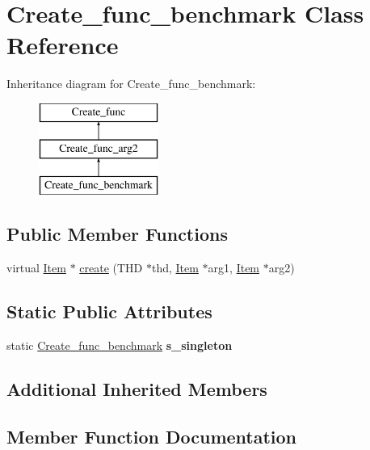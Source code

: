 \hypertarget{classCreate__func__benchmark}{}\section{Create\+\_\+func\+\_\+benchmark Class Reference}
\label{classCreate__func__benchmark}
Inheritance diagram for Create\+\_\+func\+\_\+benchmark\+:\begin{figure}[H]
\begin{center}
\leavevmode
\includegraphics[height=3.000000cm]{classCreate__func__benchmark}
\end{center}
\end{figure}
\subsection*{Public Member Functions}
\begin{DoxyCompactItemize}
\item 
virtual \mbox{\hyperlink{classItem}{Item}} $\ast$ \mbox{\hyperlink{classCreate__func__benchmark_acb85d1eecc34e6050847c6d6f1016d4b}{create}} (T\+HD $\ast$thd, \mbox{\hyperlink{classItem}{Item}} $\ast$arg1, \mbox{\hyperlink{classItem}{Item}} $\ast$arg2)
\end{DoxyCompactItemize}
\subsection*{Static Public Attributes}
\begin{DoxyCompactItemize}
\item 
\mbox{\label{classCreate__func__benchmark_a68f35b692774b919ee4c3ee4e62da90e}} 
static \mbox{\hyperlink{classCreate__func__benchmark}{Create\+\_\+func\+\_\+benchmark}} {\bfseries s\+\_\+singleton}
\end{DoxyCompactItemize}
\subsection*{Additional Inherited Members}


\subsection{Member Function Documentation}
\mbox{\label{classCreate__func__benchmark_acb85d1eecc34e6050847c6d6f1016d4b}} 
